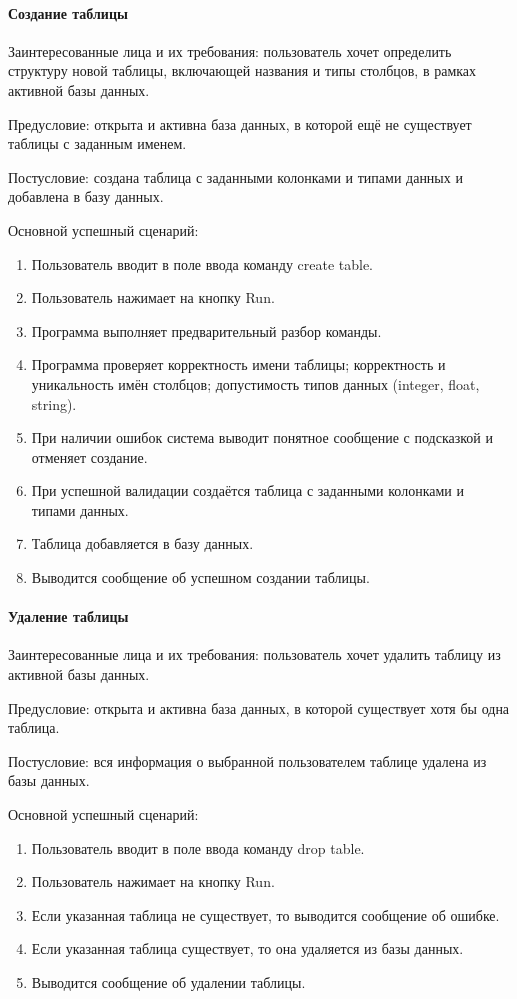 \paragraph{Создание таблицы}

Заинтересованные лица и их требования: пользователь хочет определить структуру новой таблицы, включающей названия и типы столбцов, в рамках активной базы данных.

Предусловие: открыта и активна база данных, в которой ещё не существует таблицы с заданным именем.

Постусловие: создана таблица с заданными колонками и типами данных и добавлена в базу данных.

Основной успешный сценарий:
\begin{enumerate}
	\item Пользователь вводит в поле ввода команду create table.
	\item Пользователь нажимает на кнопку Run.	
	\item Программа выполняет предварительный разбор команды.	
	\item Программа проверяет корректность имени таблицы; корректность и уникальность имён столбцов;	допустимость типов данных (integer, float, string).	
	\item При наличии ошибок система выводит понятное сообщение с подсказкой и отменяет создание.	
	\item При успешной валидации создаётся таблица с заданными колонками и типами данных.
	\item Таблица добавляется в базу данных.	
	\item Выводится сообщение об успешном создании таблицы.
\end{enumerate}

\paragraph{Удаление таблицы}

Заинтересованные лица и их требования: пользователь хочет удалить таблицу из активной базы данных.

Предусловие: открыта и активна база данных, в которой существует хотя бы одна таблица.

Постусловие: вся информация о выбранной пользователем таблице удалена из базы данных.

Основной успешный сценарий:
\begin{enumerate}
	\item Пользователь вводит в поле ввода команду drop table.
	\item Пользователь нажимает на кнопку Run.
	\item Если указанная таблица не существует, то выводится сообщение об ошибке.
	\item Если указанная таблица существует, то она удаляется из базы данных.
	\item Выводится сообщение об удалении таблицы.	
\end{enumerate}

